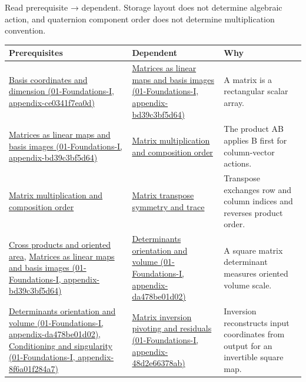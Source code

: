Read prerequisite → dependent. Storage layout does not determine algebraic action, and quaternion component order does not determine multiplication convention.

{\def\LTcaptype{none} %
\begin{longtable}[]{@{}
  >{\raggedright\arraybackslash}p{}
  >{\raggedright\arraybackslash}p{}
  >{\raggedright\arraybackslash}p{}@{}}
\toprule\noalign{}
\begin{minipage}[b]{\linewidth}\raggedright
Prerequisites
\end{minipage} & \begin{minipage}[b]{\linewidth}\raggedright
Dependent
\end{minipage} & \begin{minipage}[b]{\linewidth}\raggedright
Why
\end{minipage} \\
\midrule\noalign{}
\endhead
\bottomrule\noalign{}
\endlastfoot
\href{../01-Foundations-I/main.pdf\#nameddest=appendix-ce0341f7ea0d}{Basis coordinates and dimension (01-Foundations-I, appendix-ce0341f7ea0d)} & \href{../01-Foundations-I/main.pdf\#nameddest=appendix-bd39c3bf5d64}{Matrices as linear maps and basis images (01-Foundations-I, appendix-bd39c3bf5d64)} & A matrix is a rectangular scalar array. \\
\href{../01-Foundations-I/main.pdf\#nameddest=appendix-bd39c3bf5d64}{Matrices as linear maps and basis images (01-Foundations-I, appendix-bd39c3bf5d64)} & \hyperref[appendix-ab31ef447dbf]{Matrix multiplication and composition order} & The product AB applies B first for column-vector actions. \\
\hyperref[appendix-ab31ef447dbf]{Matrix multiplication and composition order} & \hyperref[appendix-175ca5ff874d]{Matrix transpose symmetry and trace} & Transpose exchanges row and column indices and reverses product order. \\
\hyperref[appendix-2391db8052b1]{Cross products and oriented area}, \href{../01-Foundations-I/main.pdf\#nameddest=appendix-bd39c3bf5d64}{Matrices as linear maps and basis images (01-Foundations-I, appendix-bd39c3bf5d64)} & \href{../01-Foundations-I/main.pdf\#nameddest=appendix-da478be01d02}{Determinants orientation and volume (01-Foundations-I, appendix-da478be01d02)} & A square matrix determinant measures oriented volume scale. \\
\href{../01-Foundations-I/main.pdf\#nameddest=appendix-da478be01d02}{Determinants orientation and volume (01-Foundations-I, appendix-da478be01d02)}, \href{../01-Foundations-I/main.pdf\#nameddest=appendix-8f6a01f284a7}{Conditioning and singularity (01-Foundations-I, appendix-8f6a01f284a7)} & \href{../01-Foundations-I/main.pdf\#nameddest=appendix-48d2e66378ab}{Matrix inversion pivoting and residuals (01-Foundations-I, appendix-48d2e66378ab)} & Inversion reconstructs input coordinates from output for an invertible square map. \\

\end{longtable}}
